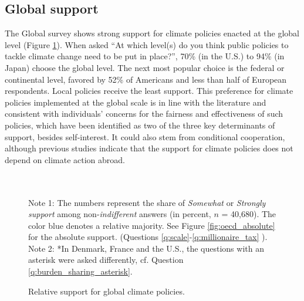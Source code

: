 \subsection{Global support}\label{subsubsec:global_support}

The Global survey shows strong support for climate policies enacted at the global level (Figure \ref{fig:oecd}). %
When asked ``At which level(s) do you think public policies to tackle climate change need to be put in place?'', 70\% (in the U.S.) to 94\% (in Japan) choose the global level. The next most popular choice is the federal or continental level, favored by 52\% of Americans and less than half of European respondents. Local policies receive the least support. This preference for climate policies implemented at the global scale is in line with the literature\cite{beiser-mcgrath_could_2019} and consistent with individuals' concerns for the fairness and effectiveness of such policies, which have been identified as two of the three key determinants of support, besides self-interest.\citep{klenert_making_2018,douenne_yellow_2022,dechezlepretre_fighting_2022} It could also stem from conditional cooperation, although previous studies indicate that the support for climate policies does not depend on climate action abroad.\citep{aklin_prisoners_2020,tingley_conditional_2014}


\begin{figure}[h!]
  \caption[Relative support for global climate policies]{Relative support for global climate policies.} 
  \label{fig:oecd} %
  {\footnotesize \\ $\quad$ \\ Note 1: The numbers represent the share of \textit{Somewhat} or \textit{Strongly support} among non-\textit{indifferent} answers (in percent, $n$ = 40,680). The color blue denotes a relative majority. See Figure \ref{fig:oecd_absolute} for the absolute support. (Questions \ref{q:scale}-\ref{q:millionaire_tax}%
). \\ Note 2: *In Denmark, France and the U.S., the questions with an asterisk were asked differently, cf. Question \ref{q:burden_sharing_asterisk}. } 
\end{figure}


